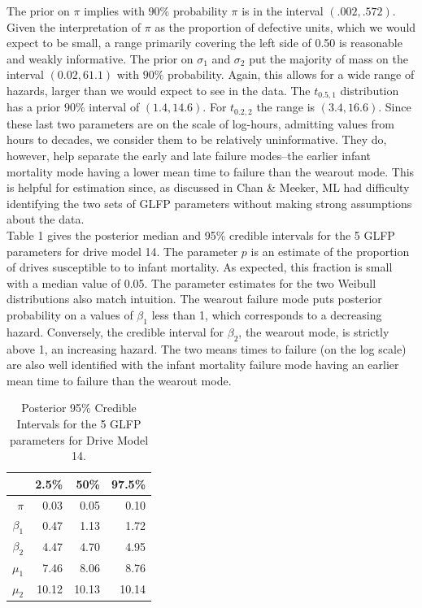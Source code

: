 \documentclass[12pt]{article}
\begin{document}
The prior on $\pi$ implies with $90\%$ probability $\pi$ is in the interval $(.002, .572)$.  Given the interpretation of $\pi$ as the proportion of defective units, which we would expect to be small, a range primarily covering the left side of 0.50 is reasonable and weakly informative.  The prior on $\sigma_1$ and $\sigma_2$ put the majority of mass on the interval $(0.02, 61.1)$ with $90\%$ probability.  Again, this allows for a wide range of hazards, larger than we would expect to see in the data.  The $t_{0.5,1}$ distribution has a prior $90\%$ interval of $(1.4,14.6)$. For $t_{0.2,2}$ the range is $(3.4,16.6)$. Since these last two parameters are on the scale of log-hours, admitting values from hours to decades, we consider them to be relatively uninformative.  They do, however, help separate the early and late failure modes--the earlier infant mortality mode having a lower mean time to failure than the wearout mode.  This is helpful for estimation since, as discussed in Chan & Meeker, ML had difficulty identifying the two sets of GLFP parameters without making strong assumptions about the data.  \\


Table 1 gives the posterior median and 95\% credible intervals for the 5 GLFP parameters for drive model 14.  The parameter $p$ is an estimate of the proportion of drives susceptible to to infant mortality.  As expected, this fraction is small with a median value of 0.05.  The parameter estimates for the two Weibull distributions also match intuition.  The wearout failure mode puts posterior probability on a values of $\beta_1$ less than 1, which corresponds to a decreasing hazard.  Conversely, the credible interval for $\beta_2$, the wearout mode, is strictly above 1, an increasing hazard.  The two means times to failure (on the log scale) are also well identified with the infant mortality failure mode having an earlier mean time to failure than the wearout mode. 

\begin{table}[H]
\centering
\begin{tabular}{rrrr}
  \hline
 & 2.5\% & 50\% & 97.5\% \\ 
  \hline
$\pi$ & 0.03 & 0.05 & 0.10 \\ 
 $\beta_1$ & 0.47 & 1.13 & 1.72 \\ 
  $\beta_2$ & 4.47 & 4.70 & 4.95 \\ 
  $\mu_1$ & 7.46 & 8.06 & 8.76 \\ 
  $\mu_2$ & 10.12 & 10.13 & 10.14 \\ 
   \hline
\end{tabular}
\caption{Posterior 95\% Credible Intervals for the 5 GLFP parameters for Drive Model 14.}
\label{table:1}
\end{table}
\end{document}
